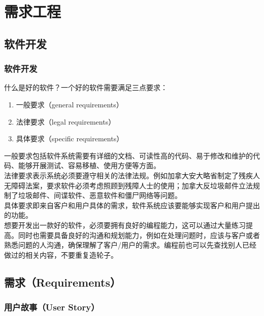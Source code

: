 \chapter{需求工程}

\section{软件开发}

\subsection{软件开发}

什么是好的软件？一个好的软件需要满足三点要求：

\begin{enumerate}
    \item 一般要求（general requirements）
    \item 法律要求（legal requirements）
    \item 具体要求（specific requirements）
\end{enumerate}

一般要求包括软件系统需要有详细的文档、可读性高的代码、易于修改和维护的代码、能够开展测试、容易移植、使用方便等方面。\\

法律要求表示系统必须要遵守相关的法律法规。例如加拿大安大略省制定了残疾人无障碍法案，要求软件必须考虑照顾到残障人士的使用；加拿大反垃圾邮件立法规制了垃圾邮件、间谍软件、恶意软件和僵尸网络等问题。\\

具体要求即来自客户和用户具体的需求，软件系统应该要能够实现客户和用户提出的功能。\\

想要开发出一款好的软件，必须要拥有良好的编程能力，这可以通过大量练习提高。同时也需要具备良好的沟通和规划能力，例如在处理问题时，应该与客户或者熟悉问题的人沟通，确保理解了客户/用户的需求。编程前也可以先查找别人已经做过的相关内容，不要重复造轮子。

\newpage

\section{需求（Requirements）}

\subsection{用户故事（User Story）}

